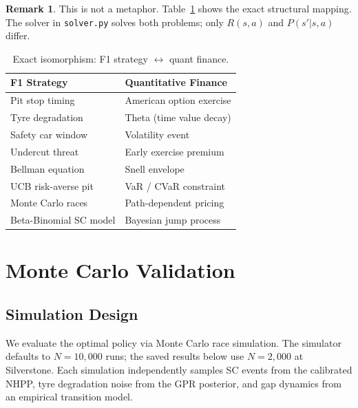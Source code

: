 \documentclass[11pt, a4paper, twocolumn]{article}
\numberwithin{equation}{section}
\theoremstyle{definition}
\newtheorem{remark}{Remark}[section]
\begin{document}
\begin{remark}
This is not a metaphor. Table~\ref{tab:iso} shows the exact structural
mapping. The solver in \texttt{solver.py} solves both problems; only
$R(s,a)$ and $P(s'|s,a)$ differ.
\end{remark}

\begin{table}[!h]
  \centering
  \small
  \caption{Exact isomorphism: F1 strategy $\leftrightarrow$ quant finance.}
  \label{tab:iso}
  \setlength{\tabcolsep}{4pt}
  \begin{tabular}{@{}ll@{}}
    \toprule
    \textbf{F1 Strategy} & \textbf{Quantitative Finance} \\
    \midrule
    \rowcolor{rowalt}
    Pit stop timing        & American option exercise \\
    Tyre degradation       & Theta (time value decay) \\
    \rowcolor{rowalt}
    Safety car window      & Volatility event \\
    Undercut threat        & Early exercise premium \\
    \rowcolor{rowalt}
    Bellman equation       & Snell envelope \\
    UCB risk-averse pit    & VaR / CVaR constraint \\
    \rowcolor{rowalt}
    Monte Carlo races      & Path-dependent pricing \\
    Beta-Binomial SC model & Bayesian jump process \\
    \bottomrule
  \end{tabular}
\end{table}

\section{Monte Carlo Validation}

\subsection{Simulation Design}

We evaluate the optimal policy via Monte Carlo race simulation. The simulator
defaults to $N = 10{,}000$ runs; the saved results below use $N = 2{,}000$ at
Silverstone. Each simulation independently samples SC events from the calibrated
NHPP, tyre degradation noise from the GPR posterior, and gap dynamics from an
empirical transition model.
\end{document}
